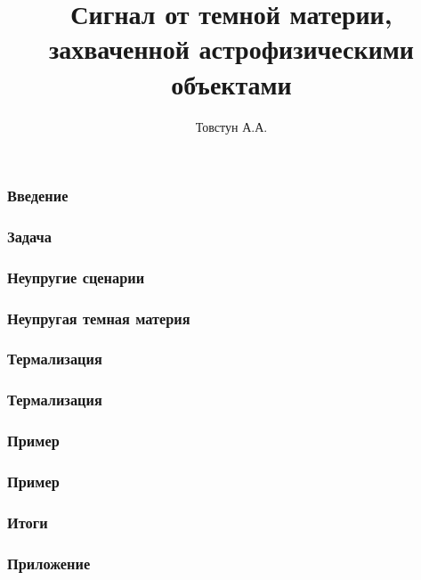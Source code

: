 
\title{Сигнал от темной материи, захваченной астрофизическими объектами} 
\author[]{Товстун А.А.}
	
	\begin{frame}
		\titlepage %
	\end{frame}
	
	\begin{frame}
		\frametitle{Введение}
		
	\end{frame}

	\begin{frame}
		\frametitle{Задача}
		
	\end{frame}

	\begin{frame}
		\frametitle{Неупругие сценарии}
		
	\end{frame}

	\begin{frame}
		\frametitle{Неупругая темная материя}
		
	\end{frame}

	\begin{frame}
		\frametitle{Термализация}
		
	\end{frame}
	
	\begin{frame}
		\frametitle{Термализация}
		
	\end{frame}

	\begin{frame}
		\frametitle{Пример}
		
	\end{frame}

%		

	\begin{frame}
		\frametitle{Пример}
		
	\end{frame}

	\begin{frame}
		\frametitle{Итоги}
		
	\end{frame}
	
	\begin{frame}
		\frametitle{Приложение}
		
	\end{frame}

 

